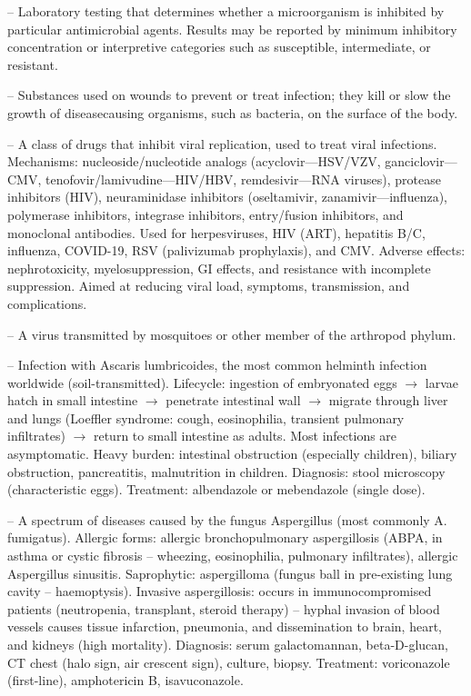 -- Laboratory testing that determines whether a microorganism is inhibited by particular antimicrobial agents. Results may be reported by minimum inhibitory concentration or interpretive categories such as susceptible, intermediate, or resistant.

-- Substances used on wounds to prevent or treat infection; they kill or slow the growth of diseasecausing organisms, such as bacteria, on the surface of the body.

-- A class of drugs that inhibit viral replication, used to treat viral infections. Mechanisms: nucleoside/nucleotide analogs (acyclovir—HSV/VZV, ganciclovir—CMV, tenofovir/lamivudine—HIV/HBV, remdesivir—RNA viruses), protease inhibitors (HIV), neuraminidase inhibitors (oseltamivir, zanamivir—influenza), polymerase inhibitors, integrase inhibitors, entry/fusion inhibitors, and monoclonal antibodies. Used for herpesviruses, HIV (ART), hepatitis B/C, influenza, COVID-19, RSV (palivizumab prophylaxis), and CMV. Adverse effects: nephrotoxicity, myelosuppression, GI effects, and resistance with incomplete suppression. Aimed at reducing viral load, symptoms, transmission, and complications.

-- A virus transmitted by mosquitoes or other member of the arthropod phylum.

-- Infection with Ascaris lumbricoides, the most common helminth infection worldwide (soil-transmitted). Lifecycle: ingestion of embryonated eggs $\rightarrow$ larvae hatch in small intestine $\rightarrow$ penetrate intestinal wall $\rightarrow$ migrate through liver and lungs (Loeffler syndrome: cough, eosinophilia, transient pulmonary infiltrates) $\rightarrow$ return to small intestine as adults. Most infections are asymptomatic. Heavy burden: intestinal obstruction (especially children), biliary obstruction, pancreatitis, malnutrition in children. Diagnosis: stool microscopy (characteristic eggs). Treatment: albendazole or mebendazole (single dose).

-- A spectrum of diseases caused by the fungus Aspergillus (most commonly A. fumigatus). Allergic forms: allergic bronchopulmonary aspergillosis (ABPA, in asthma or cystic fibrosis -- wheezing, eosinophilia, pulmonary infiltrates), allergic Aspergillus sinusitis. Saprophytic: aspergilloma (fungus ball in pre-existing lung cavity -- haemoptysis). Invasive aspergillosis: occurs in immunocompromised patients (neutropenia, transplant, steroid therapy) -- hyphal invasion of blood vessels causes tissue infarction, pneumonia, and dissemination to brain, heart, and kidneys (high mortality). Diagnosis: serum galactomannan, beta-D-glucan, CT chest (halo sign, air crescent sign), culture, biopsy. Treatment: voriconazole (first-line), amphotericin B, isavuconazole.

